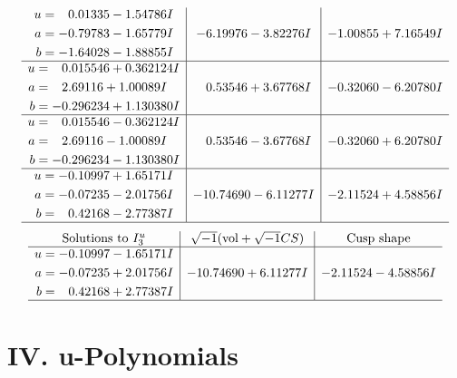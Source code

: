 \documentclass[1p]{elsarticle_modified}
\theoremstyle{definition}
\newcommand{\I}{\sqrt{-1}}
\begin{document}
$$\begin{array}{c|c|c}
\begin{aligned}
u &= \phantom{-}0.01335 - 1.54786 I \\
a &= -0.79783 - 1.65779 I \\
b &= -1.64028 - 1.88855 I\end{aligned}
 & -6.19976 - 3.82276 I & -1.00855 + 7.16549 I \\ \hline\begin{aligned}
u &= \phantom{-}0.015546 + 0.362124 I \\
a &= \phantom{-}2.69116 + 1.00089 I \\
b &= -0.296234 + 1.130380 I\end{aligned}
 & \phantom{-}0.53546 + 3.67768 I & -0.32060 - 6.20780 I \\ \hline\begin{aligned}
u &= \phantom{-}0.015546 - 0.362124 I \\
a &= \phantom{-}2.69116 - 1.00089 I \\
b &= -0.296234 - 1.130380 I\end{aligned}
 & \phantom{-}0.53546 - 3.67768 I & -0.32060 + 6.20780 I \\ \hline\begin{aligned}
u &= -0.10997 + 1.65171 I \\
a &= -0.07235 - 2.01756 I \\
b &= \phantom{-}0.42168 - 2.77387 I\end{aligned}
 & -10.74690 - 6.11277 I & -2.11524 + 4.58856 I\\
 \hline 
 \end{array}$$\newpage$$\begin{array}{c|c|c}  
\text{Solutions to }I^u_{3}& \I (\text{vol} + \sqrt{-1}CS) & \text{Cusp shape}\\
 \hline 
\begin{aligned}
u &= -0.10997 - 1.65171 I \\
a &= -0.07235 + 2.01756 I \\
b &= \phantom{-}0.42168 + 2.77387 I\end{aligned}
 & -10.74690 + 6.11277 I & -2.11524 - 4.58856 I\\
 \hline 
 \end{array}$$\newpage
\newpage\renewcommand{\arraystretch}{1}
\centering \section*{ IV. u-Polynomials}
\end{document}
